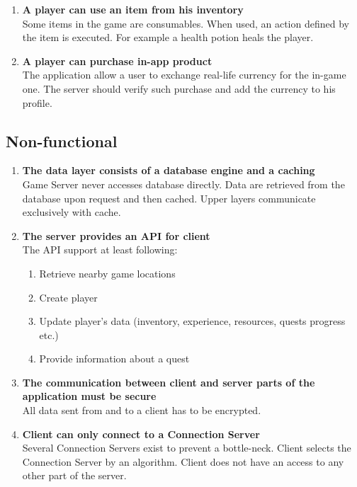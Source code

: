\begin{enumerate}
			\item \textbf{A player can use an item from his inventory} \\
			Some items in the game are consumables. When used, an action defined by the item is executed. For example a health potion heals the player.
			
			\item \textbf{A player can purchase in-app product} \\
			The application allow a user to exchange real-life currency for the in-game one. The server should verify such purchase and add the currency to his profile.
			
		\end{enumerate}
		
		
	\subsection{Non-functional}
	
		\begin{enumerate}
			\item \textbf{The data layer consists of a database engine and a caching} \\
			Game Server never accesses database directly. Data are retrieved from the database upon request and then cached. Upper layers communicate exclusively with cache.		
			
			\item \textbf{The server provides an API for client} \\
			The API support at least following:
			\begin{enumerate}
				\item Retrieve nearby game locations
				\item Create player
				\item Update player's data (inventory, experience, resources, quests progress etc.)
				\item Provide information about a quest 			
			\end{enumerate}
			
			\item \textbf{The communication between client and server parts of the application must be secure} \\
			All data sent from and to a client has to be encrypted.
	
			\item \textbf{Client can only connect to a Connection Server} \\
			Several Connection Servers exist to prevent a bottle-neck. Client selects the Connection Server by an algorithm. Client does not have an access to any other part of the server.
		\end{enumerate}
